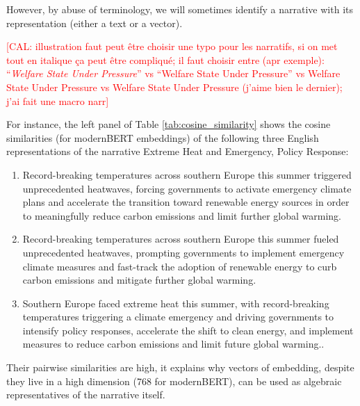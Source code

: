 \documentclass[
  journal=medium,
  manuscript=article-type,
  year=2025,
  volume=1,
]{cup-journal}
\def\narr#1{{\sc #1}}
\begin{document}
However, by abuse of terminology, we will sometimes identify a narrative
with its representation (either a text or a vector).

\textcolor{red}{[CAL: illustration faut peut être choisir une typo pour les narratifs, si on met tout en italique ça peut être compliqué; il faut choisir entre (apr exemple): ``\emph{Welfare State Under Pressure}'' vs ``Welfare State Under Pressure'' vs {\sf\small Welfare State Under Pressure} vs {\sc Welfare State Under Pressure} (j'aime bien le dernier); j'ai fait une macro {\sf narr}]}

{\color{ForestGreen}
For instance, the left panel of Table \ref{tab:cosine_similarity} shows the cosine similarities (for modernBERT embeddings) of the following three English representations of 
the narrative  \narr{Extreme Heat and Emergency, Policy Response}:
\begin{enumerate}
    \item \narr{\small Record-breaking temperatures across southern Europe this summer triggered unprecedented heatwaves, forcing governments to activate emergency climate plans and accelerate the transition toward renewable energy sources in order to meaningfully reduce carbon emissions and limit further global warming.}
    \item \narr{\small Record-breaking temperatures across southern Europe this summer fueled unprecedented heatwaves, prompting governments to implement emergency climate measures and fast-track the adoption of renewable energy to curb carbon emissions and mitigate further global warming.}
    \item \narr{\small Southern Europe faced extreme heat this summer, with record-breaking temperatures triggering a climate emergency and driving governments to intensify policy responses, accelerate the shift to clean energy, and implement measures to reduce carbon emissions and limit future global warming.}.
\end{enumerate}
Their pairwise similarities are high, it explains why vectors of embedding, despite they live in a high dimension (768 for modernBERT), can be used as algebraic representatives of the narrative itself.

}
\end{document}
